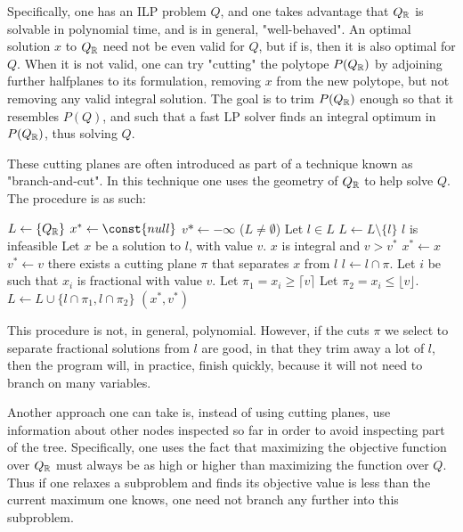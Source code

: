 Specifically, one has an ILP problem $Q$, and one takes advantage that $Q_{\mathbb{R}}$ is solvable in polynomial time, and is in general, "well-behaved". An optimal solution $x$ to $Q_{\mathbb{R}}$ need not be even valid for $Q$, but if is, then it is also optimal for $Q$. When it is not valid, one can try "cutting" the polytope $P(Q_{\mathbb{R}})$ by adjoining further halfplanes to its formulation, removing $x$ from the new polytope, but not removing any valid integral solution. The goal is to trim $P(Q_{\mathbb{R}})$ enough so that it resembles $P(Q)$, and such that a fast LP solver finds an integral optimum in $P(Q_{\mathbb{R}})$, thus solving $Q$.

These cutting planes are often introduced as part of a technique known as "branch-and-cut". In this technique one uses the geometry of $Q_{\mathbb{R}}$ to help solve $Q$. The procedure is as such:

\begin{codebox}
\li $L \gets \{Q_{\mathbb{R}}\}$
\li $x^* \gets \const{null}$
\li $v* \gets -\infty$
\li \While ($L \ne \emptyset$)
 \Do
\li    Let $l \in L$
\li    $L \gets L \setminus \{l\}$
\li    \If $l$ is infeasible
    \Do
\li      {}
    \End
\li    Let $x$ be a solution to $l$, with value $v$.
\li    \If $x$ is integral and $v > v^*$
    \Do
\li      $x^* \gets x$
\li      $v^* \gets v$
\li      {}
    \End
\li    \If there exists a cutting plane $\pi$ that separates $x$ from $l$
    \Do
\li      $l \gets l \cap \pi$.
\li      {}
    \End
\li    Let $i$ be such that $x_i$ is fractional with value $v$.
\li    Let $\pi_1 = x_i \ge \lceil v \rceil$
\li    Let $\pi_2 = x_i \le \lfloor v \rfloor$.
\li    $L \gets L \cup \{l \cap \pi_1, l \cap \pi_2\}$
    \End
\li \Return $(x^*, v^*)$
\end{codebox}

This procedure is not, in general, polynomial. However, if the cuts $\pi$ we select to separate fractional solutions from $l$ are good, in that they trim away a lot of $l$, then the program will, in practice, finish quickly, because it will not need to branch on many variables.

Another approach one can take is, instead of using cutting planes, use information about other nodes inspected so far in order to avoid inspecting part of the tree. Specifically, one uses the fact that maximizing the objective function over $Q_{\mathbb{R}}$ must always be as high or higher than maximizing the function over $Q$. Thus if one relaxes a subproblem and finds its objective value is less than the current maximum one knows, one need not branch any further into this subproblem.

